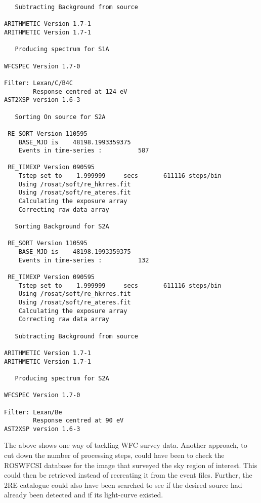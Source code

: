 \begin{small}
\begin{verbatim}
   Subtracting Background from source

ARITHMETIC Version 1.7-1
ARITHMETIC Version 1.7-1

   Producing spectrum for S1A

WFCSPEC Version 1.7-0

Filter: Lexan/C/B4C
        Response centred at 124 eV
AST2XSP version 1.6-3

   Sorting On source for S2A

 RE_SORT Version 110595
    BASE_MJD is    48198.1993359375
    Events in time-series :          587

 RE_TIMEXP Version 090595
    Tstep set to    1.999999     secs       611116 steps/bin
    Using /rosat/soft/re_hkrres.fit
    Using /rosat/soft/re_ateres.fit
    Calculating the exposure array
    Correcting raw data array

   Sorting Background for S2A

 RE_SORT Version 110595
    BASE_MJD is    48198.1993359375
    Events in time-series :          132

 RE_TIMEXP Version 090595
    Tstep set to    1.999999     secs       611116 steps/bin
    Using /rosat/soft/re_hkrres.fit
    Using /rosat/soft/re_ateres.fit
    Calculating the exposure array
    Correcting raw data array

   Subtracting Background from source

ARITHMETIC Version 1.7-1
ARITHMETIC Version 1.7-1

   Producing spectrum for S2A

WFCSPEC Version 1.7-0

Filter: Lexan/Be
        Response centred at 90 eV
AST2XSP version 1.6-3

\end{verbatim}
\end{small}

The above shows one way of tackling \ro WFC survey data.  Another
approach, to cut down the number of processing steps, could have been to check
the ROSWFCSI database for the image that surveyed the sky region of interest.
This could then be retrieved instead of recreating it from the event files.
Further, the 2RE catalogue could also have been searched to see if the desired
source had already been detected and if its light-curve existed.


